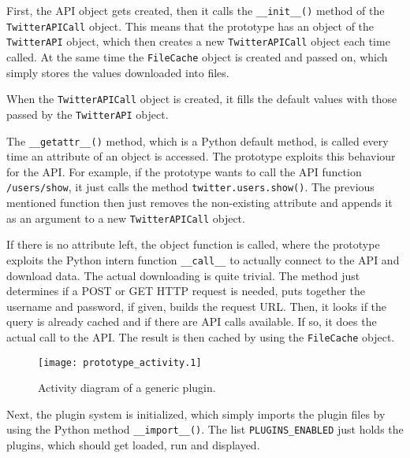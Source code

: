 \lstset{language=python}

First, the API object gets created, then it calls the \texttt{\_\_init\_\_()}
method of the \texttt{TwitterAPICall} object. This means that the prototype
has an object of the \texttt{TwitterAPI} object, which then creates a new
\texttt{TwitterAPICall} object each time called. At the same time the
\texttt{FileCache} object is created and passed on, which simply stores the
values downloaded into files.

When the \texttt{TwitterAPICall} object is created, it fills the default
values with those passed by the \texttt{TwitterAPI} object.

The \texttt{\_\_getattr\_\_()} method, which is a Python default method, is
called every time an attribute of an object is accessed. The prototype exploits
this behaviour for the \Twitter{} API. For example, if the prototype wants to
call the API function \texttt{/users/show}, it just calls the method
\texttt{twitter.users.show()}. The previous mentioned function then just
removes the non-existing attribute and appends it as an argument to a new
\texttt{TwitterAPICall} object.

If there is no attribute left, the object function is called, where the
prototype exploits the Python intern function \texttt{\_\_call\_\_} to actually
connect to the \Twitter{} API and download data. The actual downloading is
quite trivial. The method just determines if a POST or GET HTTP request is
needed, puts together the username and password, if given, builds the request
URL. Then, it looks if the query is already cached and if there are API calls
available. If so, it does the actual call to the \Twitter{} API. The result is
then cached by using the \texttt{FileCache} object.

\begin{figure}[htb]
  \begin{center}
    \texttt{[image: prototype\_activity.1]}
    \caption{Activity diagram of a generic plugin.}
    \label{fig:prototype_activity}
  \end{center}
\end{figure}

Next, the plugin system is initialized, which simply imports the plugin files
by using the Python method \texttt{\_\_import\_\_()}. The list
\texttt{PLUGINS\_ENABLED} just holds the plugins, which should get loaded, run
and displayed.

